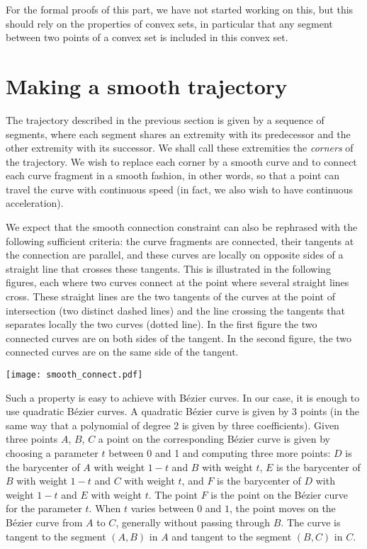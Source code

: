 \documentclass{easychair}
\begin{document}
For the formal proofs of this part, we have not started working on
this, but this should rely on the properties of convex sets, in
particular that any segment between two points of a convex set is
included in this convex set.

\section{Making a smooth trajectory}
The trajectory described in the previous section is given by a
sequence of segments, where each segment shares an extremity with its
predecessor and the other extremity with its successor.  We shall call
these extremities the {\em corners} of the trajectory.  We wish to
replace each corner by a smooth curve and to connect each curve fragment in
a smooth fashion, in other words, so that a point can travel the curve with
continuous speed (in fact, we also wish to have continuous acceleration).

We expect that the smooth connection constraint can also be rephrased
with the following sufficient criteria: the curve fragments are connected,
their tangents at the connection are parallel, and these curves are
locally on opposite sides of a straight line that crosses these
tangents.  This is illustrated in the following figures, each where
two curves connect at the point where several straight lines cross.
These straight lines are the two tangents of the curves at the point of
intersection (two distinct dashed lines) and the line crossing the
tangents that separates locally the two curves (dotted line).  In the
first figure the two connected curves are on both sides of the tangent.  In the second figure, the two connected curves are on the same side of the tangent.

\begin{center}
\texttt{[image: smooth\_connect.pdf]}
\end{center}

Such a property is easy to achieve with Bézier curves.  In our case,
it is enough to use quadratic Bézier curves.  A quadratic Bézier curve
is given by 3 points (in the same way that a polynomial of degree 2 is
given by three coefficients).  Given three points \(A\), \(B\), \(C\)
a point on the corresponding Bézier curve is given by choosing a
parameter \(t\) between 0 and 1 and computing three more points:
\(D\) is the barycenter of \(A\) with weight \(1 - t\) and \(B\) with
weight \(t\), \(E\) is the barycenter of \(B\) with weight \(1 - t\)
and \(C\) with weight \(t\), and \(F\) is the barycenter of \(D\) with
weight \(1-t\) and \(E\) with weight \(t\).  The point \(F\) is the
point on the Bézier curve for the parameter \(t\).  When \(t\) varies
between \(0\) and \(1\), the point moves on the Bézier curve from \(A\)
to \(C\), generally without passing through \(B\).  The curve
is tangent to the segment \((A,B)\) in \(A\) and tangent to
the segment \((B,C)\) in \(C\).
\end{document}
